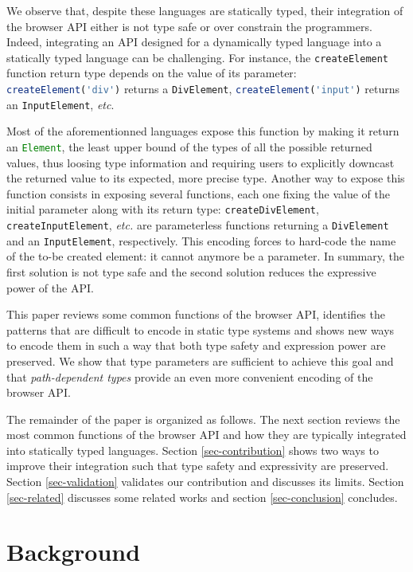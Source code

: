 \documentclass{llncs}
\newcommand{\jscode}[1]{\lstinline[language=JavaScript]|#1|}
\begin{document}
We observe that, despite these languages are statically typed, their integration of the browser API either is not type safe or over constrain the programmers. Indeed, integrating an API designed for a dynamically typed language into a statically typed language can be challenging. For instance, the \jscode{createElement} function return type depends on the value of its parameter: \jscode{createElement('div')} returns a \jscode{DivElement}, \jscode{createElement('input')} returns an \jscode{InputElement}, \emph{etc}.

Most of the aforementionned languages expose this function by making it return an \jscode{Element}, the least upper bound of the types of all the possible returned values, thus loosing type information and requiring users to explicitly downcast the returned value to its expected, more precise type. Another way to expose this function consists in exposing several functions, each one fixing the value of the initial parameter along with its return type: \jscode{createDivElement}, \jscode{createInputElement}, \emph{etc.} are parameterless functions returning a \jscode{DivElement} and an \jscode{InputElement}, respectively. This encoding forces to hard-code the name of the to-be created element: it cannot anymore be a parameter. In summary, the first solution is not type safe and the second solution reduces the expressive power of the API.

This paper reviews some common functions of the browser API, identifies the patterns that are difficult to encode in static type systems and shows new ways to encode them in such a way that both type safety and expression power are preserved. We show that type parameters are sufficient to achieve this goal and that \emph{path-dependent types} provide an even more convenient encoding of the browser API.

The remainder of the paper is organized as follows. The next section reviews the most common functions of the browser API and how they are typically integrated into statically typed languages. Section \ref{sec-contribution} shows two ways to improve their integration such that type safety and expressivity are preserved. Section \ref{sec-validation} validates our contribution and discusses its limits. Section \ref{sec-related} discusses some related works and section \ref{sec-conclusion} concludes.

\section{Background}
\label{sec-background}
\end{document}
